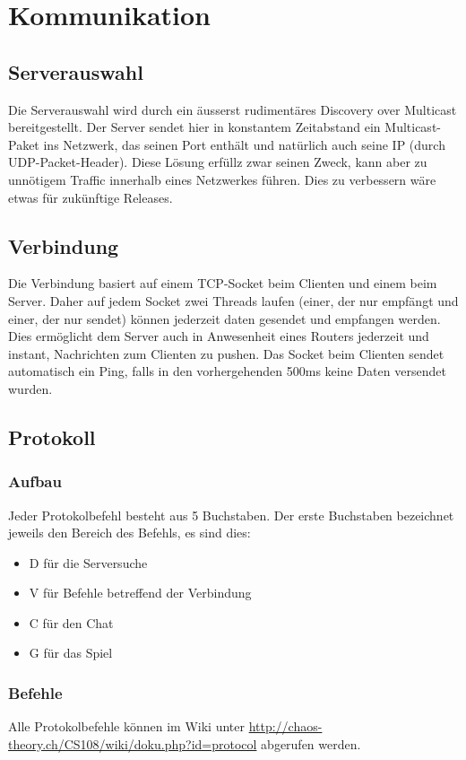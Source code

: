 \documentclass[ngerman, 12pt, pdftex]{scrartcl}[2006/07/30]
\begin{document}
\section{Kommunikation}
\subsection{Serverauswahl}
Die Serverauswahl wird durch ein äusserst rudimentäres Discovery over Multicast bereitgestellt. Der Server sendet hier in konstantem Zeitabstand ein Multicast-Paket ins Netzwerk, das seinen Port enthält und natürlich auch seine IP (durch UDP-Packet-Header). Diese Lösung erfüllz zwar seinen Zweck, kann aber zu unnötigem Traffic innerhalb eines Netzwerkes führen. Dies zu verbessern wäre etwas für zukünftige Releases.

\subsection{Verbindung}
Die Verbindung basiert auf einem TCP-Socket beim Clienten und einem beim Server. Daher auf jedem Socket zwei Threads laufen (einer, der nur empfängt und einer, der nur sendet) können jederzeit daten gesendet und empfangen werden. Dies ermöglicht dem Server auch in Anwesenheit eines Routers jederzeit und instant, Nachrichten zum Clienten zu pushen. Das Socket beim Clienten sendet automatisch ein Ping, falls in den vorhergehenden 500ms keine Daten versendet wurden.


\subsection{Protokoll}
\subsubsection{Aufbau}
Jeder Protokolbefehl besteht aus 5 Buchstaben. Der erste Buchstaben bezeichnet jeweils den Bereich des Befehls, es sind dies:
\begin{itemize}
\item D für die Serversuche
\item V für Befehle betreffend der Verbindung
\item C für den Chat
\item G für das Spiel
\end{itemize}
\subsubsection{Befehle}
Alle Protokolbefehle können im Wiki unter \url{http://chaos-theory.ch/CS108/wiki/doku.php?id=protocol} abgerufen werden.
\end{document}
